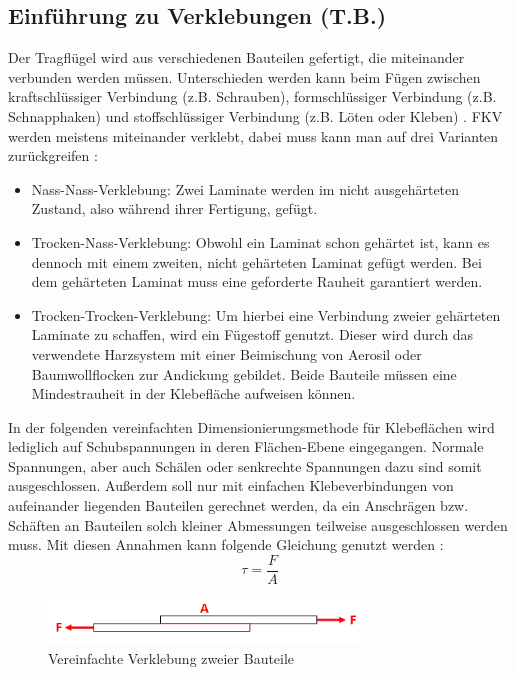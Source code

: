 \subsection{Einführung zu Verklebungen (T.B.)}\label{Verklebung}
Der Tragflügel wird aus verschiedenen Bauteilen gefertigt, die miteinander verbunden werden müssen. Unterschieden werden kann beim Fügen zwischen kraftschlüssiger Verbindung (z.B. Schrauben), formschlüssiger Verbindung (z.B. Schnapphaken) und stoffschlüssiger Verbindung (z.B. Löten oder Kleben) \cite{item23}. FKV werden meistens miteinander verklebt, dabei muss kann man auf drei Varianten zurückgreifen \cite{item4}\cite{Traktor}:
\begin{itemize}
	\item Nass-Nass-Verklebung: Zwei Laminate werden im nicht ausgehärteten Zustand, also während ihrer Fertigung, gefügt.
	\item Trocken-Nass-Verklebung: Obwohl ein Laminat schon gehärtet ist, kann es dennoch mit einem zweiten, nicht gehärteten Laminat gefügt werden. Bei dem gehärteten Laminat muss eine geforderte Rauheit garantiert werden.
	\item Trocken-Trocken-Verklebung: Um hierbei eine Verbindung zweier gehärteten Laminate zu schaffen, wird ein Fügestoff genutzt. Dieser wird durch das verwendete Harzsystem mit einer Beimischung von Aerosil oder Baumwollflocken zur Andickung gebildet. Beide Bauteile müssen eine Mindestrauheit in der Klebefläche aufweisen können.
\end{itemize}

\noindent In der folgenden vereinfachten Dimensionierungsmethode für Klebeflächen wird lediglich auf Schubspannungen in deren Flächen-Ebene eingegangen. Normale Spannungen, aber auch Schälen oder senkrechte Spannungen dazu sind somit ausgeschlossen. Außerdem soll nur mit einfachen Klebeverbindungen von aufeinander liegenden Bauteilen gerechnet werden, da ein Anschrägen bzw. Schäften an Bauteilen solch kleiner Abmessungen teilweise ausgeschlossen werden muss. Mit diesen Annahmen kann folgende Gleichung genutzt werden \cite{item23}:
\begin{equation}
	\tau=\frac{F}{A}
\end{equation}
\begin{figure}[h]
	\centering
	\includegraphics[width=0.75\textwidth]{Bilder/Kleben.png}
	\caption{Vereinfachte Verklebung zweier Bauteile}
\end{figure}
\FloatBarrier


